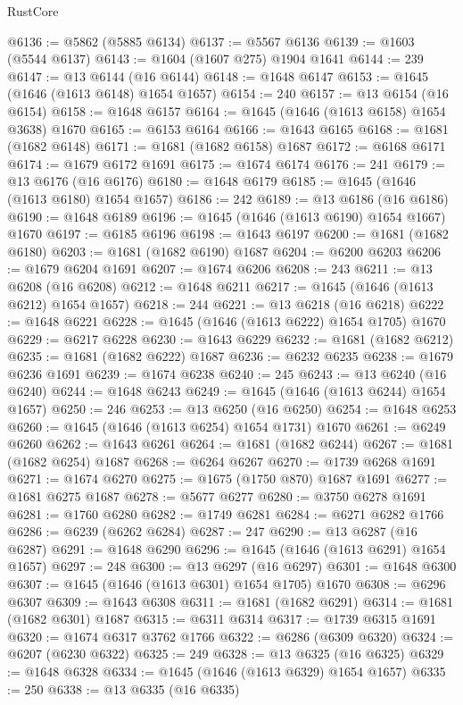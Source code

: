 \begin{lexlean}{RustCore}
\begin{coremodule}
@6136 := @5862 (@5885 @6134)
@6137 := @5567 @6136
@6139 := @1603 (@5544 @6137)
@6143 := @1604 (@1607 @275) @1904 @1641
@6144 := 239
@6147 := @13 @6144 (@16 @6144)
@6148 := @1648 @6147
@6153 := @1645 (@1646 (@1613 @6148) @1654 @1657)
@6154 := 240
@6157 := @13 @6154 (@16 @6154)
@6158 := @1648 @6157
@6164 := @1645 (@1646 (@1613 @6158) @1654 @3638) @1670
@6165 := @6153 @6164
@6166 := @1643 @6165
@6168 := @1681 (@1682 @6148)
@6171 := @1681 (@1682 @6158) @1687
@6172 := @6168 @6171
@6174 := @1679 @6172 @1691
@6175 := @1674 @6174
@6176 := 241
@6179 := @13 @6176 (@16 @6176)
@6180 := @1648 @6179
@6185 := @1645 (@1646 (@1613 @6180) @1654 @1657)
@6186 := 242
@6189 := @13 @6186 (@16 @6186)
@6190 := @1648 @6189
@6196 := @1645 (@1646 (@1613 @6190) @1654 @1667) @1670
@6197 := @6185 @6196
@6198 := @1643 @6197
@6200 := @1681 (@1682 @6180)
@6203 := @1681 (@1682 @6190) @1687
@6204 := @6200 @6203
@6206 := @1679 @6204 @1691
@6207 := @1674 @6206
@6208 := 243
@6211 := @13 @6208 (@16 @6208)
@6212 := @1648 @6211
@6217 := @1645 (@1646 (@1613 @6212) @1654 @1657)
@6218 := 244
@6221 := @13 @6218 (@16 @6218)
@6222 := @1648 @6221
@6228 := @1645 (@1646 (@1613 @6222) @1654 @1705) @1670
@6229 := @6217 @6228
@6230 := @1643 @6229
@6232 := @1681 (@1682 @6212)
@6235 := @1681 (@1682 @6222) @1687
@6236 := @6232 @6235
@6238 := @1679 @6236 @1691
@6239 := @1674 @6238
@6240 := 245
@6243 := @13 @6240 (@16 @6240)
@6244 := @1648 @6243
@6249 := @1645 (@1646 (@1613 @6244) @1654 @1657)
@6250 := 246
@6253 := @13 @6250 (@16 @6250)
@6254 := @1648 @6253
@6260 := @1645 (@1646 (@1613 @6254) @1654 @1731) @1670
@6261 := @6249 @6260
@6262 := @1643 @6261
@6264 := @1681 (@1682 @6244)
@6267 := @1681 (@1682 @6254) @1687
@6268 := @6264 @6267
@6270 := @1739 @6268 @1691
@6271 := @1674 @6270
@6275 := @1675 (@1750 @870) @1687 @1691
@6277 := @1681 @6275 @1687
@6278 := @5677 @6277
@6280 := @3750 @6278 @1691
@6281 := @1760 @6280
@6282 := @1749 @6281
@6284 := @6271 @6282 @1766
@6286 := @6239 (@6262 @6284)
@6287 := 247
@6290 := @13 @6287 (@16 @6287)
@6291 := @1648 @6290
@6296 := @1645 (@1646 (@1613 @6291) @1654 @1657)
@6297 := 248
@6300 := @13 @6297 (@16 @6297)
@6301 := @1648 @6300
@6307 := @1645 (@1646 (@1613 @6301) @1654 @1705) @1670
@6308 := @6296 @6307
@6309 := @1643 @6308
@6311 := @1681 (@1682 @6291)
@6314 := @1681 (@1682 @6301) @1687
@6315 := @6311 @6314
@6317 := @1739 @6315 @1691
@6320 := @1674 @6317 @3762 @1766
@6322 := @6286 (@6309 @6320)
@6324 := @6207 (@6230 @6322)
@6325 := 249
@6328 := @13 @6325 (@16 @6325)
@6329 := @1648 @6328
@6334 := @1645 (@1646 (@1613 @6329) @1654 @1657)
@6335 := 250
@6338 := @13 @6335 (@16 @6335)

\end{coremodule}
\end{lexlean}
